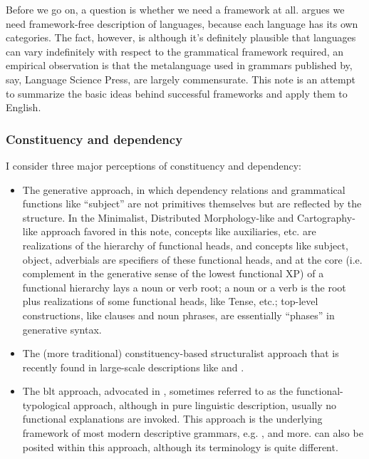 \documentclass[UTF8, a4paper, oneside, scheme=plain, 12pt]{ctexbook}
\begin{document}
{Before we go on, a question is whether we need a framework at all.
\citet{frameworkfree} argues we need framework-free description of languages,
because each language has its own categories.
The fact, however, is although it's definitely plausible that 
languages can vary indefinitely with respect to 
the grammatical framework required, 
an empirical observation is 
that the metalanguage used in grammars published by, say, Language Science Press, 
are largely commensurate.
This note is an attempt to summarize the basic ideas behind  
successful frameworks and apply them to English.

\subsubsection{Constituency and dependency}

I consider three major perceptions of constituency and dependency:
\begin{itemize}
    \item The generative approach, 
        in which dependency relations and grammatical functions 
        like ``subject'' are not primitives themselves 
        but are reflected by the structure.
        In the Minimalist, Distributed Morphology-like
        and Cartography-like approach favored in this note, 
        concepts like auxiliaries, etc. are realizations of 
        the hierarchy of functional heads, 
        and concepts like subject, object, adverbials are 
        specifiers of these functional heads, 
        and at the core (i.e. complement in the generative sense of the lowest functional XP) 
        of a functional hierarchy lays 
        a noun or verb root; 
        a noun or a verb is the root plus realizations of some functional heads, 
        like Tense, etc.;
        top-level constructions, like clauses and noun phrases, 
        are essentially ``phases'' in generative syntax. 
    \item The (more traditional) constituency-based structuralist approach 
    that is recently found in large-scale descriptions like  
    \citet{cgel} and \citet{abeille2021grande}.
    \item The \ac{blt} approach, advocated in \citet{dixon2009basic1,dixon2010basic2,dixon2012basic3},
        sometimes referred to as the functional-typological approach, 
        although in pure linguistic description, 
        usually no functional explanations are invoked.
        This approach is the underlying framework 
        of most modern descriptive grammars, e.g. 
        \citet{jacques2021grammar,Friesen2017,forker2020grammar}, and more. 
        \citet{quirk1985} can also be posited within this approach, although its terminology is quite different.
\end{itemize}

}
\end{document}
